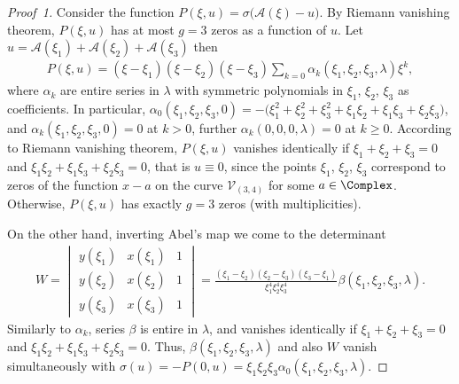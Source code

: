 \begin{proof}[Proof~1] Consider the function $P(\xi,u)=\sigma\bigl(\mathcal{A}(\xi)-u\bigr)$. By Riemann vanishing theorem, $P(\xi,u)$ has at most $g=3$ zeros as a function of $u$. Let $u=\mathcal{A}(\xi_1)+\mathcal{A}(\xi_2)+\mathcal{A}(\xi_3)$ then \begin{gather*}
P(\xi,u) = (\xi-\xi_1)(\xi-\xi_2)(\xi-\xi_3)\sum_{k=0} \alpha_k (\xi_1,\xi_2,\xi_3,\lambda)\xi^k,
\end{gather*}
where $\alpha_k$ are entire series in $\lambda$ with symmetric polynomials in $\xi_1$, $\xi_2$, $\xi_3$ as coefficients. In particular, $\alpha_0 (\xi_1,\xi_2,\xi_3,0) = -\big(\xi_1^2+\xi_2^2+\xi_3^2 +\xi_1 \xi_2 + \xi_1 \xi_3 + \xi_2\xi_3\big)$, and $\alpha_k(\xi_1,\xi_2,\xi_3,0)=0$ at $k>0$, further $\alpha_k(0,0,0,\lambda)=0$ at $k\geqslant 0$. According to Riemann vanishing theorem, $P(\xi,u)$ vanishes identically if $\xi_1+\xi_2+\xi_3=0$ and $\xi_1\xi_2+ \xi_1\xi_3 + \xi_2 \xi_3 = 0$, that is $u\equiv 0$, since the points $\xi_1$, $\xi_2$, $\xi_3$ correspond to zeros of the function $x-a$ on the curve $\mathcal{V}_{(3,4)}$ for some $a\in \Complex$. Otherwise, $P(\xi,u)$ has exactly $g=3$ zeros (with multiplicities).

On the other hand, inverting Abel's map we come to the determinant
\begin{gather*}
 W = \begin{vmatrix}
 y(\xi_1) & x(\xi_1) & 1 \\ y(\xi_2) & x(\xi_2) & 1\\ y(\xi_3) & x(\xi_3) & 1
 \end{vmatrix} = \frac{(\xi_1-\xi_2)(\xi_2-\xi_3)(\xi_3-\xi_1)}{\xi_1^4 \xi_2^4 \xi_3^4}
 \beta (\xi_1,\xi_2,\xi_3,\lambda).
\end{gather*}
Similarly to $\alpha_k$, series $\beta$ is entire in $\lambda$, and vanishes identically if $\xi_1+\xi_2+\xi_3=0$ and $\xi_1\xi_2+ \xi_1\xi_3 + \xi_2 \xi_3 = 0$. Thus, $\beta(\xi_1,\xi_2,\xi_3,\lambda)$ and also $W$ vanish simultaneously with $\sigma(u) = - P(0,u)= \xi_1\xi_2\xi_3 \alpha_0(\xi_1,\xi_2,\xi_3,\lambda)$.


\end{proof}
